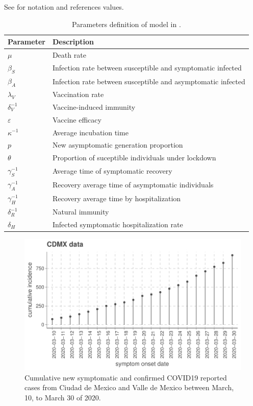      See  for notation and references
     values.
\begin{table}[h!]
	\centering
	\begin{tabular}{>{\centering}%
        p{}%
        p{}
    }
    \toprule
		\textbf{Parameter} & \textbf{Description}
  	\\
  	\midrule
		$\mu$ &
			Death rate
		\\
        $\beta_S$ &
        	Infection rate between susceptible and symptomatic infected
		\\
        $\beta_A$ &
        	Infection rate between susceptible and asymptomatic infected
		\\
        $\lambda_V$ &
        	Vaccination rate
		\\
        $\delta_{V}^{-1}$ &
        Vaccine-induced immunity
		\\
        $\varepsilon$ &
        	Vaccine efficacy
		\\
        $\kappa^{-1}$ &
        	Average incubation time
        \\
		$p$ &
			New asymptomatic generation proportion
		\\
	    $\theta$ &
        	Proportion of suceptible individuals under lockdown
        \\
        $\gamma_{S}^{-1}$ &
        	Average time of symptomatic recovery
        \\
		$\gamma_{A}^{-1}$ &
			Recovery average time of asymptomatic individuals
		\\
		$\gamma_{H}^{-1}$ &
			Recovery average time by hospitalization
		\\
        $\delta_{R}^{-1}$ &
        	Natural immunity
  		\\
  		$\delta_{H}$ &
        	Infected symptomatic hospitalization rate
  		\\
  	\bottomrule
	\end{tabular}
		\caption{
			Parameters definition of model in
			.}
    \label{tbl:dynamics_base_parameters}
\end{table}
%
\begin{figure}[htb]
    \centering
    \includegraphics[scale=0.8, keepaspectratio]{Figures/cdmx_input_data}
    \caption{%
        Cumulative new symptomatic and confirmed COVID19 reported cases from
        Ciudad de Mexico and Valle de Mexico
        \cite{cdmxDATA} between March, 10, to March 30 of
        2020.
    }
    \label{fig:data_CDMX}
\end{figure}
%
